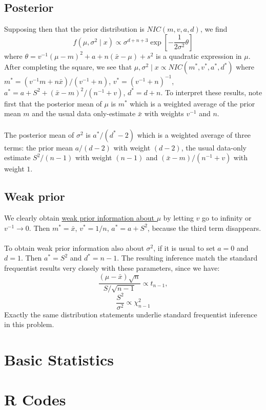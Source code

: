 \documentclass[lecture,12pt,]{pcms-l}
\numberwithin{section}{chapter}
\numberwithin{equation}{chapter}
\theoremstyle{plain}
\theoremstyle{definition}
\theoremstyle{definition}
\begin{document}
\section{Posterior}
Supposing then that  the prior distribution is $NIC(m,v,a,d)$, we find 
\begin{equation}
f(\mu, \sigma^2 \mid x) \propto \sigma^{d+n+3} \exp \left [ -\frac{1}{2 \sigma^2} \theta \right ]
\end{equation}
where $\theta = v^{-1}(\mu - m)^2 +a +n(\bar{x}-\mu)+s^2$ is a quadratic expression in $\mu$. After completing the square, we see that $\mu, \sigma^2 \mid x \propto NIC(m^*,v^*,a^*,d^*)$ where $m^*=(v^{-1}m + n \bar{x})/(v^{-1}+n)$, $v^*= (v^{-1}+n)^{-1}$, $a^* = a+S^2 +( \bar{x}-m)^2/(n^{-1}+v)$, $d^*=d+n$. To interpret these results, note first that the posterior  mean of $\mu$ is $m^*$ which is a weighted average of the prior mean $m$ and the usual data only-estimate $\bar{x}$ with weights $v^{-1}$ and $n$. 
\\
\\
The posterior mean of $\sigma^2$ is $a^* /(d^* -2)$ which is a weighted average of three terms: the prior mean $a/(d-2)$ with weight $(d-2)$, the usual data-only estimate $S^2/(n-1)$ with weight $(n-1)$ and $(\bar{x}-m)/(n^{-1}+v)$ with weight $1$.
\section{Weak prior}
We clearly obtain \underline{weak prior information about $\mu$} by letting $v$ go to infinity or $v^{-1}\rightarrow0$. Then $m^* = \bar{x}$, $v^* = 1/n$, $a^* = a+S^2$, because the third term disappears.
\\
\\
To obtain weak prior information also about $\sigma^2$, if it is usual to set $a=0$ and $d=1$. Then $a^* = S^2$ and $d^* = n-1$. The  resulting inference match the standard frequentist results very closely with these parameters, since we have:
\begin{equation}
\frac{(\mu - \bar{x})\sqrt{n}}{S/\sqrt{n-1}} \propto t_{n-1},
\end{equation}
\begin{equation}
\frac{S^2}{\sigma^2} \propto \chi^{2}_{n-1}
\end{equation}
Exactly the same distribution statements underlie standard frequentist inference in this problem.

\appendix


\chapter*{Basic Statistics}

\chapter*{R Codes}





\end{document}
